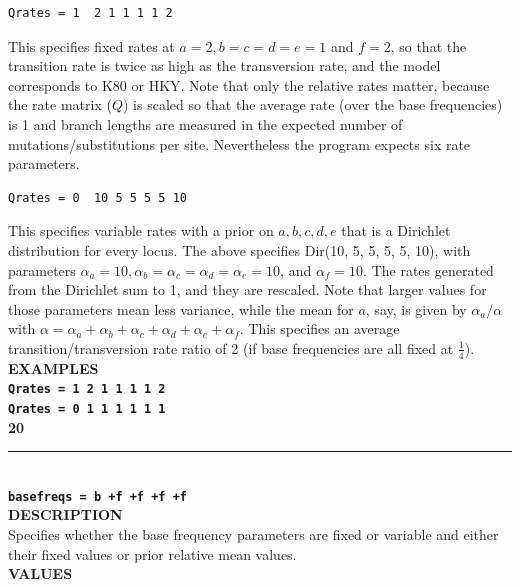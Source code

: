 \documentclass[a4paper]{book}
\numberwithin{equation}{section} \renewcommand{\baselinestretch}{0.55}
\begin{document}
\begin{verbatim}
Qrates = 1  2 1 1 1 1 2
\end{verbatim}
This specifies fixed rates at $a = 2, b = c = d = e = 1$ and $f = 2$,
so that the transition rate is twice as high as the transversion rate,
and the model corresponds to K80 or HKY.  Note that only the relative
rates matter, because the rate matrix ($Q$) is scaled so that the
average rate (over the base frequencies) is 1 and branch lengths are
measured in the expected number of mutations/substitutions per site.
Nevertheless the program expects six rate parameters.
\begin{verbatim}
Qrates = 0  10 5 5 5 5 10 
\end{verbatim}
This specifies variable rates with a prior on $a, b, c, d, e$ that is
a Dirichlet distribution for every locus.  The above specifies Dir(10,
5, 5, 5, 5, 10), with parameters
$\alpha_a = 10, \alpha_b = \alpha_c = \alpha_d = \alpha_e = 10$, and
$\alpha_f = 10$.  The rates generated from the Dirichlet sum to 1, and
they are rescaled.  Note that larger values for those parameters mean
less variance, while the mean for $a$, say, is given by
$\alpha_a/\alpha$ with
$\alpha = \alpha_a + \alpha_b + \alpha_c + \alpha_d + \alpha_e +
\alpha_f$.
This specifies an average transition/transversion rate ratio of 2 (if base frequencies are all fixed at $\frac{1}{4}$). \vspace{5pt}\\
\textbf{EXAMPLES} \vspace{5pt}\\
\textbf{\texttt{Qrates = 1  2 1 1 1 1 2}} \vspace{5pt}\\
\textbf{\texttt{Qrates = 0  1 1 1 1 1 1}}\vspace{10pt}\\
\textbf{{\large 20}} \\
\noindent\rule{\textwidth}{0.8pt} \\
\textbf{{\Large \texttt{basefreqs = b +f +f +f +f}}} \vspace{5pt}\\
\textbf{DESCRIPTION} \vspace{5pt}\\
Specifies whether the base frequency parameters are fixed or variable
and either their fixed values or prior relative mean values. \vspace{5pt}\\
\textbf{VALUES} \vspace{5pt}\\
\end{document}

